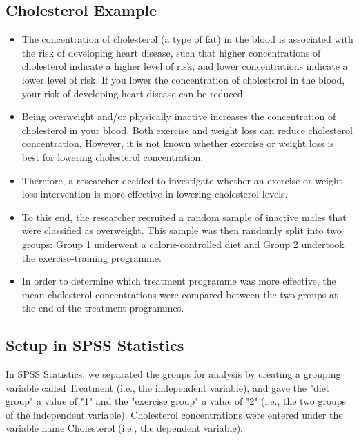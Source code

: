 \documentclass[]{article}
\begin{document}
	
\subsection{Cholesterol Example}
\begin{itemize}
\item 	The concentration of cholesterol (a type of fat) in the blood is associated with the risk of developing heart disease, such that higher concentrations of cholesterol indicate a higher level of risk, and lower concentrations indicate a lower level of risk. If you lower the concentration of cholesterol in the blood, your risk of developing heart disease can be reduced. 
\item Being overweight and/or physically inactive increases the concentration of cholesterol in your blood. Both exercise and weight loss can reduce cholesterol concentration. However, it is not known whether exercise or weight loss is best for lowering cholesterol concentration. \item Therefore, a researcher decided to investigate whether an exercise or weight loss intervention is more effective in lowering cholesterol levels. 
\item To this end, the researcher recruited a random sample of inactive males that were classified as overweight. This sample was then randomly split into two groups: Group 1 underwent a calorie-controlled diet and Group 2 undertook the exercise-training programme. 
\item In order to determine which treatment programme was more effective, the mean cholesterol concentrations were compared between the two groups at the end of the treatment programmes.
\end{itemize}

	
\subsection{Setup in SPSS Statistics}
	In SPSS Statistics, we separated the groups for analysis by creating a grouping variable called Treatment (i.e., the independent variable), and gave the "diet group" a value of "1" and the "exercise group" a value of "2" (i.e., the two groups of the independent variable). Cholesterol concentrations were entered under the variable name Cholesterol (i.e., the dependent variable). 
	
	
\end{document}
